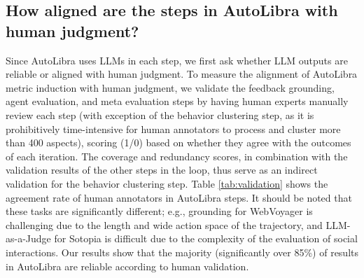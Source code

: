 \subsection{How aligned are the steps in AutoLibra with human judgment?}
Since AutoLibra uses LLMs in each step, we first ask whether LLM outputs are
reliable or aligned with human judgment. To measure the alignment of AutoLibra metric
induction with human judgment, we validate the feedback grounding, agent evaluation,
and meta evaluation steps by having human experts manually review each step (with
exception of the behavior clustering step, as it is prohibitively time-intensive
for human annotators to process and cluster more than 400 aspects), scoring (1/0)
based on whether they agree with the outcomes of each iteration. The coverage and
redundancy scores, in combination with the validation results of the other steps
in the loop, thus serve as an indirect validation for the behavior clustering step.
Table \ref{tab:validation} shows the agreement rate of human annotators in
AutoLibra steps. It should be noted that these tasks are significantly different;
e.g., grounding for WebVoyager \citep{he2024webvoyager} is challenging due to the
length and wide action space of the trajectory, and LLM-as-a-Judge for Sotopia
\citep{zhousotopia} is difficult due to the complexity of the evaluation of social
interactions. Our results show that the majority (significantly over 85\%) of results
in AutoLibra are reliable according to human validation.

